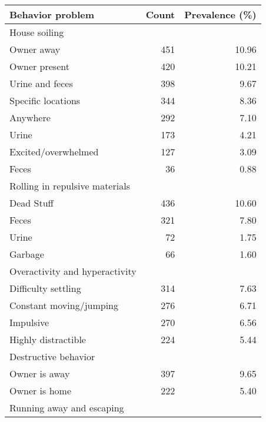 \documentclass[varwidth=\maxdimen]{standalone}
\newcommand{\subrow}[1]{\hspace{1.25em}#1}
\begin{document}
\begin{tabular}[t]{lrr}
\toprule
Behavior problem &  Count &  Prevalence (\%) \\
\midrule
House soiling \\
  \subrow{Owner away}                          &      451 &           10.96 \\
  \subrow{Owner present}                       &      420 &           10.21 \\
  \subrow{Urine and feces}                     &      398 &            9.67 \\
  \subrow{Specific locations}                  &      344 &            8.36 \\
  \subrow{Anywhere}                            &      292 &            7.10 \\
  \subrow{Urine}                               &      173 &            4.21 \\
  \subrow{Excited/overwhelmed}                 &      127 &            3.09 \\
  \subrow{Feces}                               &       36 &            0.88 \\
Rolling in repulsive materials \\
  \subrow{Dead Stuff}                          &      436 &           10.60 \\
  \subrow{Feces}                               &      321 &            7.80 \\
  \subrow{Urine}                               &       72 &            1.75 \\
  \subrow{Garbage}                             &       66 &            1.60 \\
Overactivity and hyperactivity \\
  \subrow{Difficulty settling}                 &      314 &            7.63 \\
  \subrow{Constant moving/jumping}             &      276 &            6.71 \\
  \subrow{Impulsive}                           &      270 &            6.56 \\
  \subrow{Highly distractible}                 &      224 &            5.44 \\
Destructive behavior \\
  \subrow{Owner is away}                       &      397 &            9.65 \\
  \subrow{Owner is home}                       &      222 &            5.40 \\
Running away and escaping \\

\end{tabular}
\end{document}
